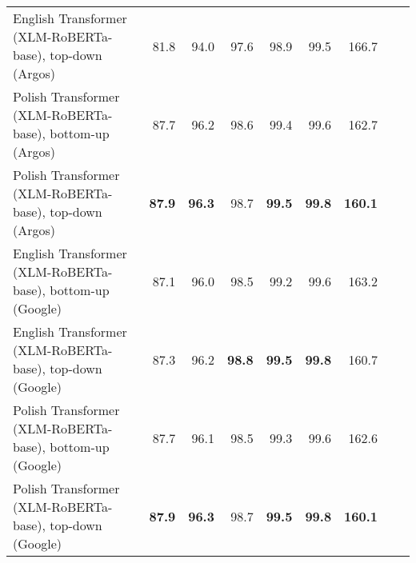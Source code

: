 \begin{table}[ht!]
{\begin{tabular}{lrrrrrrrr}
  English Transformer (XLM-RoBERTa-base), top-down (Argos) & 81.8 & 94.0 & 97.6 & 98.9 & 99.5 & 166.7 \\ 
  Polish Transformer (XLM-RoBERTa-base), bottom-up (Argos) & 87.7 & 96.2 & 98.6 & 99.4 & 99.6 & 162.7 \\ 
  Polish Transformer (XLM-RoBERTa-base), top-down (Argos) & \textbf{87.9} & \textbf{96.3} & 98.7 & \textbf{99.5} & \textbf{99.8} & \textbf{160.1} \\ 
  English Transformer (XLM-RoBERTa-base), bottom-up (Google) & 87.1 & 96.0 & 98.5 & 99.2 & 99.6 & 163.2 \\ 
  English Transformer (XLM-RoBERTa-base), top-down (Google) & 87.3 & 96.2 & \textbf{98.8} & \textbf{99.5} & \textbf{99.8} & 160.7 \\ 
  Polish Transformer (XLM-RoBERTa-base), bottom-up (Google) & 87.7 & 96.1 & 98.5 & 99.3 & 99.6 & 162.6 \\ 
  Polish Transformer (XLM-RoBERTa-base), top-down (Google) & \textbf{87.9} & \textbf{96.3} & 98.7 & \textbf{99.5} & \textbf{99.8} & \textbf{160.1} \\ 
   \hline
\end{tabular}
}
\end{table}




